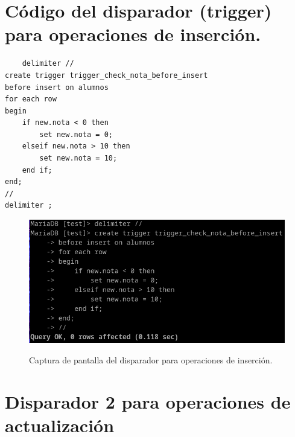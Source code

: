 \documentclass{article}
\begin{document}
\section*{Código del disparador (trigger) para operaciones de inserción.}

\begin{lstlisting}
    delimiter //
create trigger trigger_check_nota_before_insert
before insert on alumnos
for each row
begin
    if new.nota < 0 then
        set new.nota = 0;
    elseif new.nota > 10 then
        set new.nota = 10;
    end if;
end;
//
delimiter ;
\end{lstlisting}

\begin{figure}[ht]
    \centering
    {
        \includegraphics[width=\linewidth]{02screenshot.png} %
    }
    \caption{Captura de pantalla del disparador para operaciones de inserción.}
\end{figure}

\newpage %

\section*{Disparador 2 para operaciones de actualización}
\end{document}
